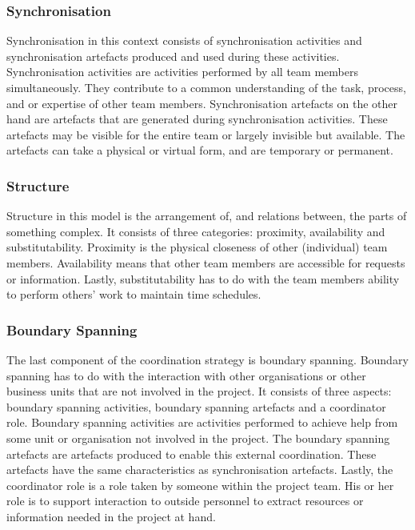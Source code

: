 \subsubsection{Synchronisation}

Synchronisation in this context consists of synchronisation activities and synchronisation artefacts produced and used during these activities. Synchronisation activities are activities performed by all team members simultaneously. They contribute to a common understanding of the task, process, and or expertise of other team members. Synchronisation artefacts on the other hand are artefacts that are generated during synchronisation activities. These artefacts may be visible for the entire team or largely invisible but available. The artefacts can take a physical or virtual form, and are temporary or permanent.

\subsubsection{Structure}

Structure in this model is the arrangement of, and relations between, the parts of something complex. It consists of three categories: proximity, availability and substitutability. Proximity is the physical closeness of other (individual) team members. Availability means that other team members are accessible for requests or information. Lastly, substitutability has to do with the team members ability to perform others' work to maintain time schedules.

\subsubsection{Boundary Spanning}

The last component of the coordination strategy is boundary spanning. Boundary spanning has to do with the interaction with other organisations or other business units that are not involved in the project. It consists of three aspects: boundary spanning activities, boundary spanning artefacts and a coordinator role. Boundary spanning activities are activities performed to achieve help from some unit or organisation not involved in the project. The boundary spanning artefacts are artefacts produced to enable this external coordination. These artefacts have the same characteristics as synchronisation artefacts. Lastly, the coordinator role is a role taken by someone within the project team. His or her role is to support interaction to outside personnel to extract resources or information needed in the project at hand.

